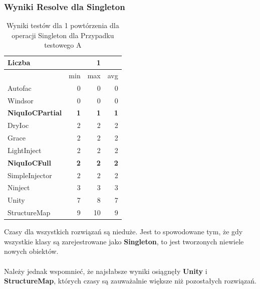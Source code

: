 \documentclass[12pt]{article}
\begin{document}
\subsubsection{Wyniki Resolve dla Singleton}
\begin{table}[H]
\captionsetup{belowskip=0pt,aboveskip=0pt}
\begin{center}
\begin{small}
	\begin{tabular}{ | l | r r r | }
    		\hline
Liczba & & 1 & \\ \hline
 & min & max & avg \\ \hline
Autofac & 0 & 0 & 0 \\ \hline
Windsor & 0 & 0 & 0 \\ \hline
\textbf{NiquIoCPartial} & \textbf{1} & \textbf{1} & \textbf{1} \\ \hline
DryIoc & 2 & 2 & 2 \\ \hline
Grace & 2 & 2 & 2 \\ \hline
LightInject & 2 & 2 & 2 \\ \hline
\textbf{NiquIoCFull} & \textbf{2} & \textbf{2} & \textbf{2} \\ \hline
SimpleInjector & 2 & 2 & 2 \\ \hline
Ninject & 3 & 3 & 3 \\ \hline
Unity & 7 & 8 & 7 \\ \hline
StructureMap & 9 & 10 & 9 \\ \hline
  	\end{tabular}
\end{small}
\end{center}
\caption{Wyniki testów dla 1 powtórzenia dla operacji Singleton dla Przypadku testowego A}
\label{TestCaseA_Singleton1}
\end{table}
Czasy dla wszystkich rozwiązań są nieduże. Jest to spowodowane tym, że gdy wszystkie klasy są zarejestrowane jako \textbf{Singleton}, to jest tworzonych niewiele nowych obiektów.\\
\\
Należy jednak wspomnieć, że najsłabsze wyniki osiągnęły \textbf{Unity} i \textbf{StructureMap}, których czasy są zauważalnie większe niż pozostałych rozwiązań.
\\ \\
\end{document}

